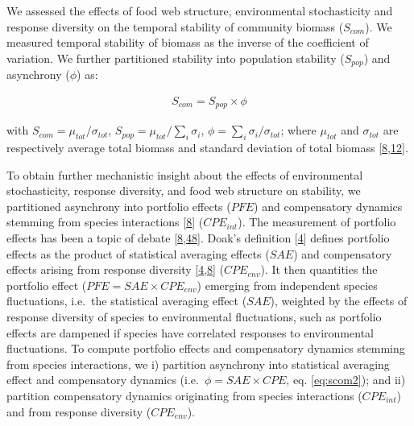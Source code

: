 \documentclass[
]{article}
\begin{document}
We assessed the effects of food web structure, environmental stochasticity and
response diversity on the temporal stability of community biomass (\(S_{com}\)).
We measured temporal stability of biomass as the inverse of the coefficient of
variation. We further partitioned stability into population stability
(\(S_{pop}\)) and asynchrony (\(\phi\)) as:

\begin{equation}
\begin{aligned}
S_{com} = S_{pop} \times \phi
\label{eq:scom}
\end{aligned}
\end{equation}

with \(S_{com} = \mu_{tot} / \sigma_{tot}\), \(S_{pop} = \mu_{tot} / \sum_i \sigma_i\),
\(\phi = \sum_i \sigma_i / \sigma_{tot}\); where \(\mu_{tot}\) and \(\sigma_{tot}\)
are respectively average total biomass and standard deviation of total biomass
{[}\protect\hyperlink{ref-zhao_biodiversity_2022}{8},\protect\hyperlink{ref-thibaut_understanding_2013}{12}{]}.

To obtain further mechanistic insight about the effects of environmental
stochasticity, response diversity, and food web structure on stability, we
partitioned asynchrony into portfolio effects (\(PFE\)) and compensatory dynamics
stemming from species interactions {[}\protect\hyperlink{ref-zhao_biodiversity_2022}{8}{]} (\(CPE_{int}\)). The
measurement of portfolio effects has been a topic of debate
{[}\protect\hyperlink{ref-zhao_biodiversity_2022}{8},\protect\hyperlink{ref-loreau_biodiversity_2021}{48}{]}. Doak's definition
{[}\protect\hyperlink{ref-doak_statistical_1998}{4}{]} defines portfolio effects as the product of statistical
averaging effects (\(SAE\)) and compensatory effects arising from response
diversity {[}\protect\hyperlink{ref-doak_statistical_1998}{4},\protect\hyperlink{ref-zhao_biodiversity_2022}{8}{]} (\(CPE_{env}\)). It
then quantities the portfolio effect (\(PFE = SAE \times CPE_{env}\)) emerging
from independent species fluctuations, i.e.~the statistical averaging effect
(\(SAE\)), weighted by the effects of response diversity of species to
environmental fluctuations, such as portfolio effects are dampened if species
have correlated responses to environmental fluctuations. To compute portfolio
effects and compensatory dynamics stemming from species interactions, we i)
partition asynchrony into statistical averaging effect and compensatory dynamics
(i.e.~\(\phi = SAE \times CPE\), eq. \eqref{eq:scom2}); and ii) partition
compensatory dynamics originating from species interactions (\(CPE_{int}\)) and
from response diversity (\(CPE_{env}\)).
\end{document}
